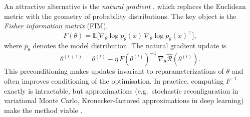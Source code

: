 An attractive alternative is the \emph{natural gradient} \cite{Amari1998-NaturalGradient,AmariDouglas1998-WhyNaturalGradient}, which replaces the Euclidean 
metric with the geometry of probability distributions. The key object is the 
\emph{Fisher information matrix} (FIM),
\begin{equation}
  F(\theta) = \mathbb{E}\big[ \nabla_\theta \log p_\theta(x)\,\nabla_\theta \log p_\theta(x)^\top \big],
\end{equation}
where $p_\theta$ denotes the model distribution. The natural gradient update is
\begin{equation}
  \theta^{(t+1)} = \theta^{(t)} - \eta\, F(\theta^{(t)})^{-1}\,\nabla_\theta \hat{\mathcal{R}}(\theta^{(t)}).
\end{equation}
This preconditioning makes updates invariant to reparameterizations of $\theta$
and often improves conditioning of the optimisation. In practice, computing
$F^{-1}$ exactly is intractable, but approximations (e.g.\ stochastic reconfiguration
in variational Monte Carlo, Kronecker-factored approximations in deep learning)
make the method viable \cite{Pfau2020-FermiNet}.

